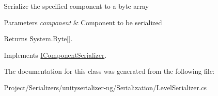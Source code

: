 Serialize the specified component to a byte array 


\begin{DoxyParams}{Parameters}
{\em component} & Component to be serialized\\
\hline
\end{DoxyParams}
\begin{DoxyReturn}{Returns}
System.\+Byte\mbox{[}\mbox{]}.
\end{DoxyReturn}


Implements \hyperlink{interface_i_component_serializer_ab2aa38005665496b62d6c54b5f0dbd31}{I\+Component\+Serializer}.



The documentation for this class was generated from the following file\+:\begin{DoxyCompactItemize}
\item 
Project/\+Serializers/unityserializer-\/ng/\+Serialization/Level\+Serializer.\+cs\end{DoxyCompactItemize}
